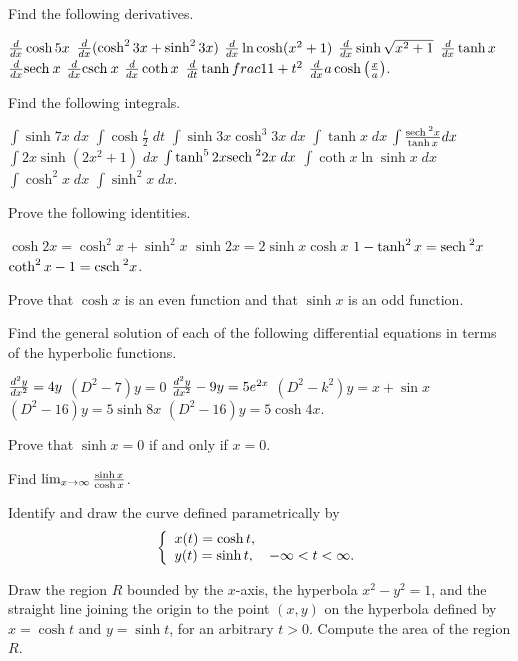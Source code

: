 \begin{exercises}

Find the following derivatives.
\begin{exenum}
\x
$\frac{d}{dx} \cosh 5x$
\x
$\frac{d}{dx} (\cosh^23x+\sinh^23x)$
\x
$\frac{d}{dx} \ln \cosh(x^2+1)$
\x
$\frac{d}{dx} \sinh \sqrt{x^2+1}$
\x
$\frac{d}{dx} \tanh x$
\x
$\frac{d}{dx} \mathrm{sech\:} x$
\x
$\frac{d}{dx} \mathrm{csch\:} x$
\x
$\frac{d}{dx} \coth x$
\x
$\frac{d}{dt} \tanh frac1{1+t^2}$
\x
$\frac{d}{dx} a \cosh \left(\frac xa \right)$.
\end{exenum}

Find the following integrals.
\begin{exenum}
\x
$\int \sinh 7x\;dx$
\x
$\int \cosh \frac t2\;dt$
\x
$\int \sinh 3x \cosh^3 3x\;dx$
\x
$\int \tanh x\;dx$
\x
$\int \frac{\mathrm{sech\:}^2x}{\tanh x} dx$
\x
$\int 2x \sinh (2x^2+1)\;dx$
\x
$\int \tanh^52x \mathrm{sech\:}^22x\;dx$
\x
$\int \coth x \ln \sinh x\;dx$
\x
$\int \cosh^2 x\;dx$
\x
$\int \sinh^2 x\;dx$.
\end{exenum}

Prove the following identities.
\begin{exenum}
\x
$\cosh 2x = \cosh^2x + \sinh^2x$
\x
$\sinh 2x = 2 \sinh x \cosh x$
\x
$1-\tanh^2x = \mathrm{sech\:}^2x$
\x
$\coth^2x - 1=\mathrm{csch\:}^2x$.
\end{exenum}

Prove that $\cosh x$ is an even function and that
$\sinh x$ is an odd function.

Find the general solution of each of the following
differential equations in terms of the hyperbolic
functions.
\begin{exenum}
\x
$\frac{d^{2}{y}}{dx^{2}} = 4y$
\x
$(D^2-7)y = 0$
\x
$\frac{d^{2}{y}}{dx^{2}} - 9y = 5e^{2x}$
\x
$(D^2-k^2)y = x + \sin x$
\x
$(D^2-16)y = 5\sinh 8x$
\x
$(D^2-16)y = 5 \cosh 4x$.
\end{exenum}

Prove that $\sinh x = 0$ if and only if $x=0$.

Find $\lim_{x\rightarrow\infty} \frac{\sinh x}{\cosh x}$.

Identify and draw the curve defined parametrically by
\[
\left\{ \begin{array}{ll} x(t) = \cosh t, \\ y(t) = \sinh t, \quad -\infty < t < \infty. \end{array} \right.
\]

\begin{exenum}
\x
Draw the region $R$ bounded by the $x$-axis, the
hyperbola $x^2-y^2 = 1$,
and the straight line joining the origin to the point
$(x,y)$ on the hyperbola defined by $x = \cosh t$
and $y = \sinh t$, for an arbitrary $t>0$.
\x
Compute the area of the region $R$.
\end{exenum}


\end{exercises}
